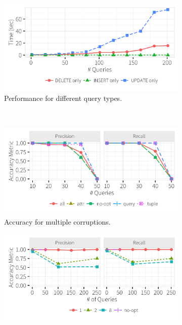 \begin{figure}[h]
\begin{subfigure}[t]{.3\textwidth}
    \label{f:singlequeryinc_time} 
    \end{subfigure}
    \begin{subfigure}[t]{.3\textwidth}
    \includegraphics[width = .99\columnwidth]{figures/indelup_time}
    \vspace*{-.3in}
    \caption{Performance for different query types.}
    \label{f:indelup_time} 
    \end{subfigure}
    \\
    \begin{subfigure}[t]{.3\textwidth}
    \includegraphics[width = .99\columnwidth]{figures/multi_pr}
    \vspace*{-.3in}
    \caption{Accuracy for multiple corruptions.}
    \label{f:multi_acc} 
    \end{subfigure}
    \begin{subfigure}[t]{.3\textwidth}
    \includegraphics[width = .99\columnwidth]{figures/incrementalcompare_acc}

\end{subfigure}
\end{figure}

